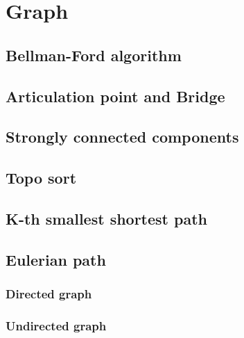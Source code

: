 \section{Graph}

\subsection{Bellman-Ford algorithm}

\subsection{Articulation point and Bridge}

\subsection{Strongly connected components}

\subsection{Topo sort}

\subsection{K-th smallest shortest path}

\subsection{Eulerian path}
  \subsubsection{Directed graph}

  \subsubsection{Undirected graph}
